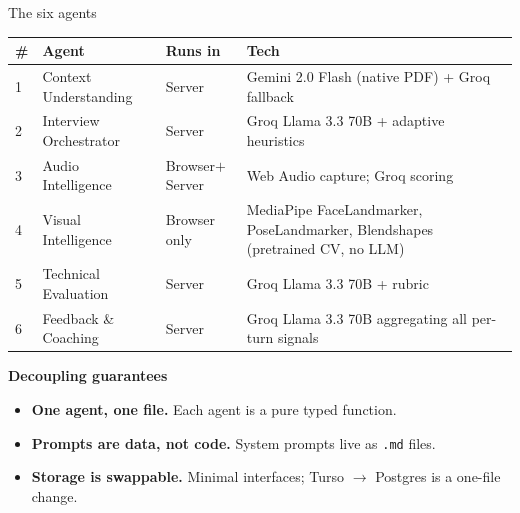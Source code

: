 \documentclass[aspectratio=169,10pt]{beamer}
\newcommand{\biglabel}[1]{\textcolor{brand}{\bfseries\large #1}}
\begin{document}
\begin{frame}{The six agents}
  \vspace{0.2cm}
  \footnotesize
  \renewcommand{\arraystretch}{1.45}
  \begin{tabular}{@{}p{0.45cm}p{4.0cm}p{2.6cm}p{6.4cm}@{}}
    \toprule
    \color{brand}\textbf{\#} & \color{brand}\textbf{Agent} & \color{brand}\textbf{Runs in} & \color{brand}\textbf{Tech} \\
    \midrule
    1 & Context Understanding & Server          & Gemini 2.0 Flash (native PDF) + Groq fallback \\
    2 & Interview Orchestrator & Server         & Groq Llama 3.3 70B + adaptive heuristics \\
    3 & Audio Intelligence    & Browser$+$Server & Web Audio capture; Groq scoring \\
    4 & Visual Intelligence   & \alert{Browser only} & MediaPipe FaceLandmarker, PoseLandmarker, Blendshapes (\alert{pretrained CV, no LLM}) \\
    5 & Technical Evaluation  & Server          & Groq Llama 3.3 70B + rubric \\
    6 & Feedback \& Coaching  & Server          & Groq Llama 3.3 70B aggregating all per-turn signals \\
    \bottomrule
  \end{tabular}

  \vspace{0.8cm}
  \biglabel{Decoupling guarantees}\par\smallskip
  \footnotesize
  \begin{itemize}
    \item \textbf{One agent, one file.} Each agent is a pure typed function.
    \item \textbf{Prompts are data, not code.} System prompts live as \texttt{.md} files.
    \item \textbf{Storage is swappable.} Minimal interfaces; Turso $\rightarrow$ Postgres is a one-file change.
  \end{itemize}
\end{frame}
\end{document}
